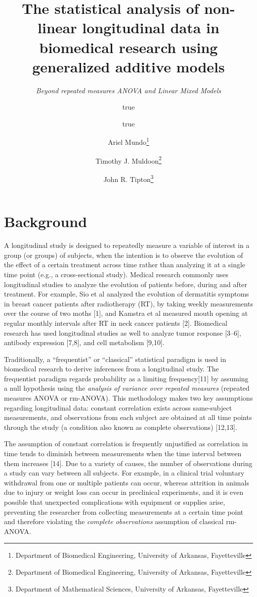 \documentclass[
]{article}
\title{\textbf{The statistical analysis of non-linear longitudinal data in biomedical research using generalized additive models}}
\subtitle{\emph{Beyond repeated measures ANOVA and Linear Mixed Models}}
\author{true \and true \and Ariel Mundo\footnote{Department of Biomedical Engineering, University of Arkansas, Fayetteville} \and Timothy J. Muldoon\footnote{Department of Biomedical Engineering, University of Arkansas, Fayetteville} \and John R. Tipton\footnote{Department of Mathematical Sciences, University of Arkansas, Fayetteville}}
\date{}
\begin{document}
\maketitle

{
\setcounter{tocdepth}{2}
\tableofcontents
}
\hypertarget{background}{%
\section{Background}\label{background}}

A longitudinal study is designed to repeatedly measure a variable of interest in a group (or groups) of subjects, when the intention is to observe the evolution of the effect of a certain treatment across time rather than analyzing it at a single time point (e.g., a cross-sectional study). Medical research commonly uses longitudinal studies to analyze the evolution of patients before, during and after treatment. For example, Sio et al analyzed the evolution of dermatitis symptoms in breast cancer patients after radiotherapy (RT), by taking weekly measurements over the course of two moths {[}1{]}, and Kamstra et al measured mouth opening at regular monthly intervals after RT in neck cancer patients {[}2{]}. Biomedical research has used longitudinal studies as well to analyze tumor response {[}3--6{]}, antibody expression {[}7,8{]}, and cell metabolism {[}9,10{]}.

Traditionally, a ``frequentist'' or ``classical'' statistical paradigm is used in biomedical research to derive inferences from a longitudinal study. The frequentist paradigm regards probability as a limiting frequency{[}11{]} by assuming a null hypothesis using the \emph{analysis of variance over repeated measures} (repeated measures ANOVA or rm-ANOVA). This methodology makes two key assumptions regarding longitudinal data: constant correlation exists across same-subject measurements, and observations from each subject are obtained at all time points through the study (a condition also known as complete observations) {[}12,13{]}.

The assumption of constant correlation is frequently unjustified as correlation in time tends to diminish between measurements when the time interval between them increases {[}14{]}.
Due to a variety of causes, the number of observations during a study can vary between all subjects. For example, in a clinical trial voluntary withdrawal from one or multiple patients can occur, whereas attrition in animals due to injury or weight loss can occur in preclinical experiments, and it is even possible that unexpected complications with equipment or supplies arise, preventing the researcher from collecting measurements at a certain time point and therefore violating the \emph{complete observations} assumption of classical rm-ANOVA.
\end{document}
